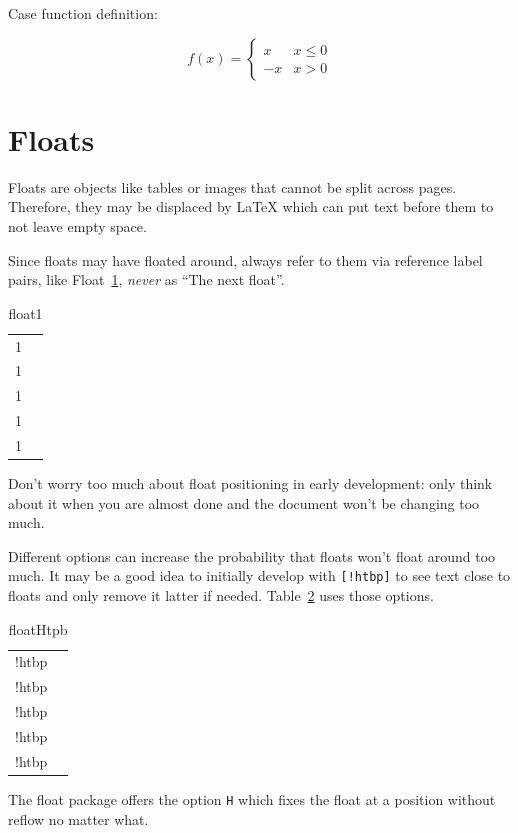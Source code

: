 \documentclass[12pt]{article}
\begin{document}
Case function definition:

\begin{equation}
f(x) =
\begin{cases}
x & x \le 0 \\
-x & x>0
\end{cases}
\end{equation}

\section{Floats}\label{floats}

Floats are objects like tables or images that cannot be split across pages. Therefore, they may be displaced by LaTeX which can put text before them to not leave empty space.

Since floats may have floated around, always refer to them via reference label pairs, like Float~\ref{float1}, \emph{never} as ``The next float''.

\begin{table}
\begin{tabular}{cc}
1 \\ 1 \\ 1 \\ 1 \\ 1 \\
\end{tabular}
\caption{float1}
\label{float1}
\end{table}

Don't worry too much about float positioning in early development: only think about it when you are almost done and the document won't be changing too much.

Different options can increase the probability that floats won't float around too much. It may be a good idea to initially develop with \lstinline|[!htbp]| to see text close to floats and only remove it latter if needed. Table~\ref{floatHtpb} uses those options.

\begin{table}
\begin{tabular}{cc}
!htbp \\ !htbp \\ !htbp \\ !htbp \\ !htbp \\
\end{tabular}
\caption{floatHtpb}
\label{floatHtpb}
\end{table}

The float package offers the option \lstinline|H| which fixes the float at a position without reflow no matter what.
\end{document}
